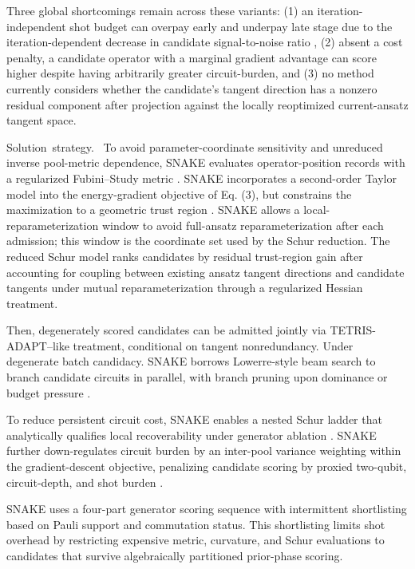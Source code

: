 \documentclass[
  reprint,
  amsmath,
  amssymb,
  aps,
  pra,
  nofootinbib,
  superscriptaddress,
  floatfix
]{revtex4-2}
\newcommand{\tentative}[1]{\textcolor{red!70!black}{#1}}
\newcommand{\structlabel}[1]{\noindent\mbox{\tentative{#1.}}~}
\begin{document}
Three global shortcomings remain across these variants: (1) an iteration-independent shot budget can overpay early and underpay late stage due to the iteration-dependent decrease in candidate signal-to-noise ratio \cite{Ikhtiarudin2025ShotEfficient}, (2) absent a cost penalty, a candidate operator with a marginal gradient advantage can score higher despite having arbitrarily greater circuit-burden, and (3) no method currently considers whether the candidate’s tangent direction has a nonzero residual component after projection against the locally reoptimized current-ansatz tangent space.


\structlabel{Solution strategy}
To avoid parameter-coordinate sensitivity and unreduced inverse pool-metric dependence, SNAKE evaluates operator-position records with a regularized Fubini--Study metric \cite{Sohail2026GeoADAPT}. SNAKE incorporates a second-order Taylor model into the energy-gradient objective of Eq. (3), but constrains the maximization to a geometric trust region \cite{Nocedal2006TrustRegion}. SNAKE allows a local-reparameterization window to avoid full-ansatz reparameterization after each admission; this window is the coordinate set used by the Schur reduction. The reduced Schur model ranks candidates by residual trust-region gain after accounting for coupling between existing ansatz tangent directions and candidate tangents under mutual reparameterization through a regularized Hessian treatment.

Then, degenerately scored candidates can be admitted jointly via TETRIS-ADAPT--like treatment\cite{Anastasiou2024}, conditional on tangent nonredundancy. Under degenerate batch candidacy. SNAKE borrows Lowerre-style beam search to branch candidate circuits in parallel, with branch pruning upon dominance or budget pressure \cite{Lowerre1976Beam}.

To reduce persistent circuit cost, SNAKE enables a nested Schur ladder that analytically qualifies local recoverability under generator ablation \cite{Vaquero2025PrunedADAPT}. SNAKE further down-regulates circuit burden by an inter-pool variance weighting within the gradient-descent objective, penalizing candidate scoring by proxied two-qubit, circuit-depth, and shot burden \cite{Verteletskyi2020CliqueCover,Yen2020CompatibleMeasurements,Ikhtiarudin2025ShotEfficient}.

SNAKE uses a four-part generator scoring sequence with intermittent shortlisting based on Pauli support and commutation status. This shortlisting limits shot overhead by restricting expensive metric, curvature, and Schur evaluations to candidates that survive algebraically partitioned prior-phase scoring.
\end{document}
